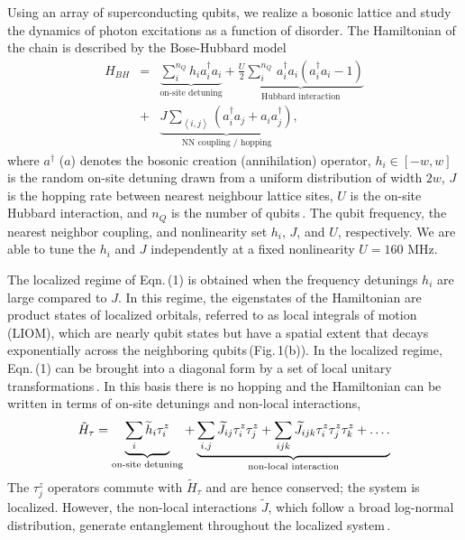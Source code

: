 Using an array of superconducting qubits, we realize a bosonic lattice and study the dynamics of photon excitations as a function of disorder. The Hamiltonian of the chain is described by the Bose-Hubbard model
\begin{eqnarray}
H_{BH} &=& \underbrace{\sum\limits_{i}^{n_Q} h_i a^{\dagger}_{i}a_{i}}_{\text{on-site detuning}} +
\underbrace{\frac{U}{2}\sum\limits_{i}^{n_Q} \,a^{\dagger}_{i}a_i(a^{\dagger}_{i}a_i-1)}_{\text{Hubbard interaction}} \nonumber \\
&+& \underbrace{J \sum_{\left< i, j \right>}\left( a^{\dagger}_{i}a_j+a_{i}a^{\dagger}_{j} \right) }_{\text{NN coupling / hopping}},
\end{eqnarray}
\noindent
where $a^{\dagger}$ ($a$) denotes the bosonic creation (annihilation) operator, $h_i\in \left[ -w, w \right]$ is the random on-site detuning drawn from a uniform distribution of width $2w$, $J$ is the hopping rate between nearest neighbour lattice sites, $U$ is the on-site Hubbard interaction, and $n_Q$ is the number of qubits\,\cite{supplement}. The qubit frequency, the nearest neighbor coupling, and nonlinearity set $h_i$, $J$, and $U$, respectively. We are able to tune the $h_i$ and $J$ independently at a fixed nonlinearity $U=160$ MHz.

The localized regime of Eqn.\,(1) is obtained when the frequency detunings $h_i$ are large compared to $J$. In this regime, the eigenstates of the Hamiltonian are product states of localized orbitals, referred to as local integrals of motion (LIOM), which are nearly qubit states but have a spatial extent that decays exponentially across the neighboring qubits\,(Fig.\,1(b)). In the localized regime, Eqn.\,(1) can be brought into a diagonal form by a set of local unitary transformations\,\cite{Serbyn2013, Huse2014}. In this basis there is no hopping and the Hamiltonian can be written in terms of on-site detunings and non-local interactions,
\vspace{10pt}
\begin{equation} %
\tilde{H}_{\tau} = \underbrace{\sum_i \widetilde{h}_i \tau^z_i}_{\text{on-site detuning}} + \underbrace{ \sum_{i,j} \widetilde{J}_{ij}\tau^z_i\tau^z_j + \sum_{ijk} \widetilde{J}_{ijk}\tau^z_i\tau^z_j\tau^z_k + \mathellipsis.}_{\text{non-local interaction}}%
\end{equation}
\noindent
The $\tau^z_j$ operators commute with $\tilde H_{\tau}$ and are hence conserved; the system is localized. However, the non-local interactions $\widetilde{J}$, which follow a broad log-normal distribution, generate entanglement throughout the localized system\,\cite{Varma2019}.

